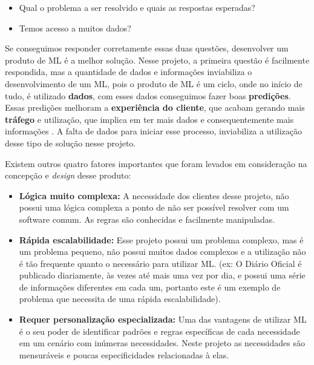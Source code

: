 \begin{apendicesenv}
\begin{itemize}
    \item Qual o problema a ser resolvido e quais as respostas esperadas?
    \item Temos acesso a muitos dados?
\end{itemize}

\par Se conseguimos responder corretamente essas duas questões, desenvolver um produto de ML é a melhor solução. Nesse projeto, a primeira questão é facilmente respondida, mas a quantidade de dados e informações inviabiliza o desenvolvimento de um ML, pois o produto de ML é um ciclo, onde no início de tudo, é utilizado \textbf{dados}, com esses dados conseguimos fazer boas \textbf{predições}. Essas predições melhoram a \textbf{experiência do cliente}, que acabam gerando mais \textbf{tráfego} e utilização, que implica em ter mais dados e consequentemente mais informações \cite{yandong2005development}. A falta de dados para iniciar esse processo, inviabiliza a utilização desse tipo de solução nesse projeto.

\par Existem outros quatro fatores importantes que foram levados em consideração na concepção e \textit{design} desse produto:

\begin{itemize}
    \item \textbf{Lógica muito complexa:} A necessidade dos clientes desse projeto, não possui uma lógica complexa a ponto de não ser possível resolver com um software comum. As regras são conhecidas e facilmente manipuladas.
    
    \item \textbf{Rápida escalabilidade:} Esse projeto possui um problema complexo, mas é um problema pequeno, não possui muitos dados complexos e a utilização não é tão frequente quanto o necessário para utilizar ML. (ex: O Diário Oficial é publicado diariamente, às vezes até mais uma vez por dia, e possui uma série de informações diferentes em cada um, portanto este é um exemplo de problema que necessita de uma rápida escalabilidade).
    
    \item \textbf{Requer personalização especializada:} Uma das vantagens de utilizar ML é o seu poder de identificar padrões e regras específicas de cada necessidade em um cenário com inúmeras necessidades. Neste projeto as necessidades são mensuráveis e poucas especificidades relacionadas à elas.
    

\end{itemize}
\end{apendicesenv}
